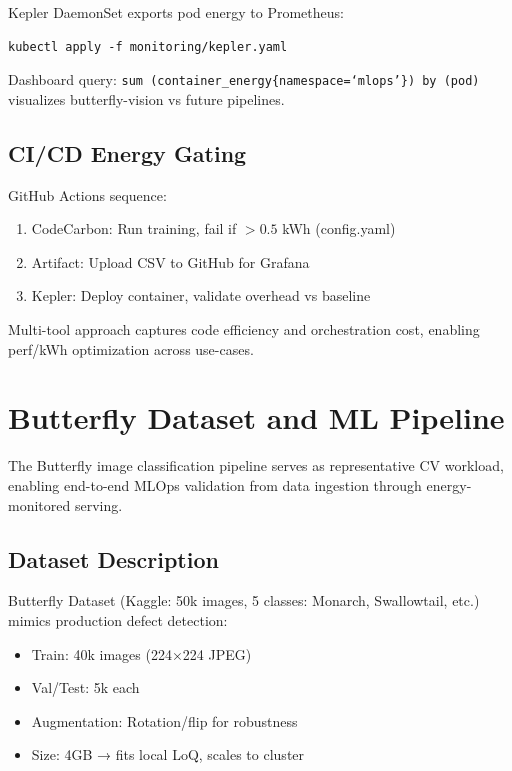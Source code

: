 Kepler DaemonSet exports pod energy to Prometheus:

\begin{verbatim}
kubectl apply -f monitoring/kepler.yaml
\end{verbatim}

Dashboard query: \texttt{sum (container\_energy\{namespace=`mlops'\}) by (pod)} visualizes butterfly-vision vs future pipelines.

\subsection{CI/CD Energy Gating}

GitHub Actions sequence:
\begin{enumerate}
\item CodeCarbon: Run training, fail if $>0.5$ kWh (config.yaml)
\item Artifact: Upload CSV to GitHub for Grafana
\item Kepler: Deploy container, validate overhead vs baseline
\end{enumerate}

Multi-tool approach captures code efficiency and orchestration cost, enabling perf/kWh optimization across use-cases.\@

\section{Butterfly Dataset and ML Pipeline}

The Butterfly image classification pipeline serves as representative CV workload, enabling end-to-end MLOps validation from data ingestion through energy-monitored serving.

\subsection{Dataset Description}

Butterfly Dataset (Kaggle: 50k images, 5 classes: Monarch, Swallowtail, etc.) mimics production defect detection:
\begin{itemize}
    \item Train: 40k images (224$\times$224 JPEG)
    \item Val/Test: 5k each
    \item Augmentation: Rotation/flip for robustness
    \item Size: 4GB → fits local LoQ, scales to cluster
\end{itemize}

